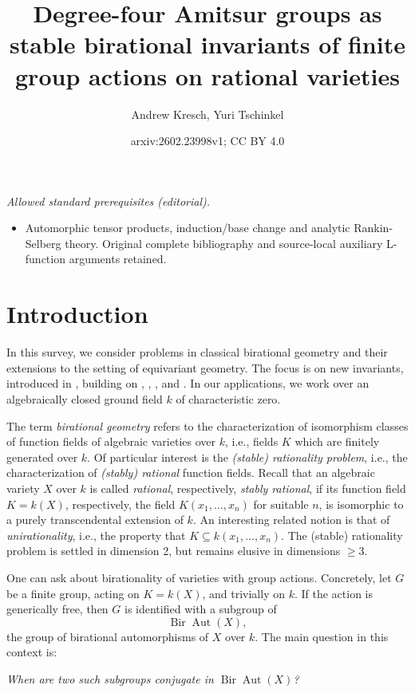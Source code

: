 \documentclass[12pt,reqno]{amsart}
\title{Degree-four Amitsur groups as stable birational invariants of finite group actions on rational varieties}
\author{Andrew Kresch, Yuri Tschinkel}
\date{arxiv:2602.23998v1; CC BY 4.0}
\theoremstyle{plain}
\theoremstyle{remark}
\theoremstyle{definition}
\numberwithin{equation}{section}
\DeclareMathOperator{\Aut}{Aut}
\DeclareMathOperator{\Bir}{Bir}
\begin{document}
\maketitle
\noindent\textit{Allowed standard prerequisites (editorial).}\begin{itemize}
\item Automorphic tensor products, induction/base change and analytic Rankin-Selberg theory. Original complete bibliography and source-local auxiliary L-function arguments retained.
\end{itemize}\medskip
\section{Introduction}
\label{sec.intro}
In this survey, we consider problems in classical birational geometry and their extensions to the setting of equivariant geometry. The focus is on new invariants, introduced in \cite{BnG}, building on \cite{KT}, \cite{KPT}, \cite{Bbar}, and 
\cite{HKTsmall}. 
In our applications, we work over an algebraically closed ground field $k$ of characteristic zero. 

The term {\em birational geometry} refers to the characterization of isomorphism classes of function fields of algebraic varieties over $k$, i.e., fields $K$ which are finitely generated over $k$. 
Of particular interest is the {\em  (stable) rationality problem}, i.e., 
the characterization of {\em (stably) rational} function fields. 
Recall that an algebraic variety $X$ over $k$ is called {\em rational}, respectively, {\em stably rational}, if its function field $K=k(X)$, respectively, the field $K(x_1,\ldots, x_n)$ for suitable $n$, 
is isomorphic to a purely transcendental extension of $k$. 
An interesting related notion is that of {\em unirationality}, 
i.e., the property that $K\subseteq k(x_1,\ldots, x_n)$.
The (stable) rationality problem is settled in dimension 2, but remains elusive in dimensions $\ge 3$. 

One can ask about birationality of varieties with group actions. Concretely, let $G$ be a finite group, acting on $K=k(X)$, and trivially on $k$. If the action is generically free, then $G$ is identified with a subgroup of 
$$
\Bir\Aut(X),
$$
the group of birational automorphisms of $X$ over $k$. The main question in this context is: 

\medskip

\noindent
{\em When are two such subgroups conjugate in $\Bir\Aut(X)$?}
\end{document}

